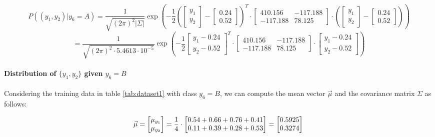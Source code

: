 \documentclass{article}
\begin{document}
\[
    P((y_1,y_2)|y_6=A) = \frac{1}{\sqrt{(2\pi)^2 |\Sigma|}} \exp \left( -\frac{1}{2} \left(\begin{bmatrix} y_1 \\ y_2 \end{bmatrix} - \begin{bmatrix} 0.24 \\ 0.52 \end{bmatrix}\right)^T \cdot \begin{bmatrix}
    410.156 & -117.188 \\
    -117.188 & 78.125
  \end{bmatrix} \cdot \left(\begin{bmatrix} y_1 \\ y_2 \end{bmatrix} - \begin{bmatrix} 0.24 \\ 0.52 \end{bmatrix}\right) \right)
\]
\[
  = \frac{1}{\sqrt{(2\pi)^2 \cdot 5.4613 \cdot 10^{-5}}} \exp \left( -\frac{1}{2} \left[ \begin{matrix} y_1 - 0.24 \\ y_2 - 0.52 \end{matrix} \right]^T \cdot \begin{bmatrix}
    410.156 & -117.188 \\
    -117.188 & 78.125  
  \end{bmatrix} \cdot \left[ \begin{matrix} y_1 - 0.24 \\ y_2 - 0.52 \end{matrix} \right] \right)
\]




\paragraph{Distribution of $\{y_1,y_2\}$ given $y_6=B$}
\paragraph{}

Considering the training data in table \ref{tab:dataset1} with class $y_6=B$, we can compute the mean vector $\vec{\mu}$ and the covariance matrix $\Sigma$ as follows:

\[
  \vec{\mu} =  \left[\begin{matrix} \mu_{y_1} \\ \mu_{y_2} \end{matrix} \right]= \frac{1}{4} \cdot 
  \left[\begin{matrix}
    0.54 + 0.66 + 0.76 + 0.41 \\
    0.11 + 0.39 + 0.28 + 0.53
  \end{matrix}\right] = \left[\begin{matrix}
    0.5925 \\
    0.3274
  \end{matrix}\right] \\
\]
\end{document}
